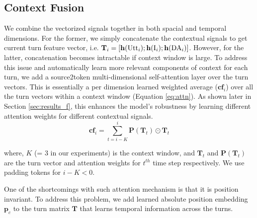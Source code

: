\subsection{Context Fusion}
We combine the vectorized signals together in both spacial and temporal dimensions. For the former, we simply concatenate the contextual signals to get current turn feature vector, i.e. ${\mathbf{T}_i} = [\mathbf{h}({\text{Utt}_i});\mathbf{h}({\text{I}_i}); \mathbf{h}({\text{DA}_i})]$. However, for the latter, concatenation %
becomes intractable if context window is large. To address this issue and automatically learn more relevant components of context for each turn, we %
add a source2token \cite{shen2017disan} multi-dimensional self-attention layer over the turn vectors. This is essentially a per dimension learned weighted average ($\mathbf{cf}_i$) over all the turn vectors within a context window (Equation \ref{eq:attn}).
As shown later in Section \ref{sec:results_f}, this enhances the  model's robustness by learning different attention weights for different contextual signals.%
\vspace{-10pt}
\begin{equation}
    \textbf{cf}_i = \sum_{t=i-K}^{i} \textbf{P}(\textbf{T}_t) \odot {\textbf{T}_t} \label{eq:attn}
\end{equation}
\vspace{-10pt}

\noindent where, $K$ (= 3 in our experiments) is the context window, and $\mathbf{T}_t$ and $\mathbf{P}(\mathbf{T}_t)$ are the turn vector and attention weights for $t^{th}$ time step %
respectively. We use padding tokens for $i-K<0$.

One of the shortcomings with such attention mechanism is that it is position invariant. To address this problem, we add learned absolute position embedding $\textbf{p}_c$ %
to the turn matrix $\mathbf{T}$ that learns temporal information across the turns.




